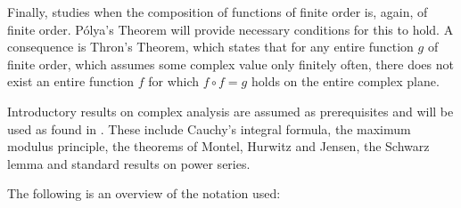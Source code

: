 Finally,  studies when the composition of functions of finite order is, again, of finite order. Pólya's Theorem will provide necessary conditions for this to hold. A consequence is Thron's Theorem, which states that for any entire function $g$ of finite order, which assumes some complex value only finitely often, there does not exist an entire function $f$ for which $f \circ f = g$ holds on the entire complex plane.

Introductory results on complex analysis are assumed as prerequisites and will be used as found in \cite{bluemlinger-complex-analysis,stein-shakarchi-princeton}. These include Cauchy's integral formula, the maximum modulus principle, the theorems of Montel, Hurwitz and Jensen, the Schwarz lemma and standard results on power series.

The following is an overview of the notation used:

